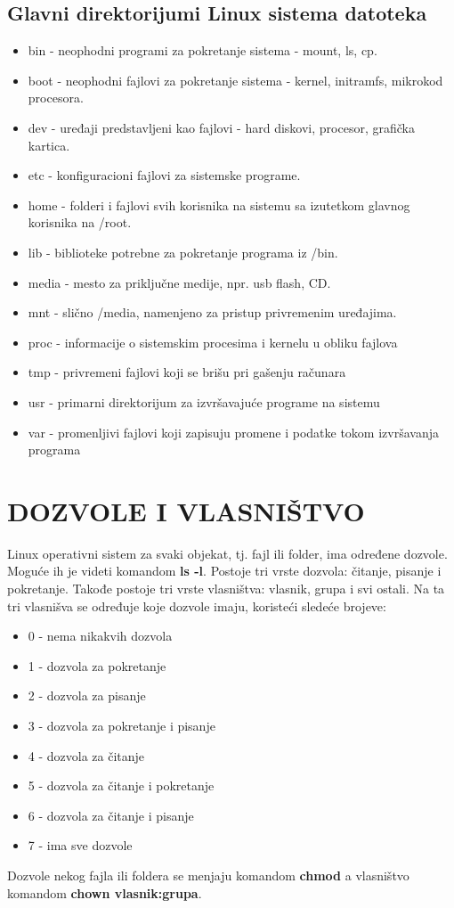 \documentclass[a4paper,14pt]{article}
\begin{document}
\subsection{Glavni direktorijumi Linux sistema datoteka}
\begin{itemize}
\item bin - neophodni programi za pokretanje sistema - mount, ls, cp.
\item boot - neophodni fajlovi za pokretanje sistema - kernel, initramfs, mikrokod procesora.
\item dev - uređaji predstavljeni kao fajlovi - hard diskovi, procesor, grafička kartica.
\item etc - konfiguracioni fajlovi za sistemske programe.
\item home - folderi i fajlovi svih korisnika na sistemu sa izutetkom glavnog korisnika na /root.
\item lib - biblioteke potrebne za pokretanje programa iz /bin.
\item media - mesto za priključne medije, npr. usb flash, CD.
\item mnt - slično /media, namenjeno za pristup privremenim uređajima.
\item proc - informacije o sistemskim procesima i kernelu u obliku fajlova
\item tmp - privremeni fajlovi koji se brišu pri gašenju računara
\item usr - primarni direktorijum za izvršavajuće programe na sistemu
\item var - promenljivi fajlovi koji zapisuju promene i podatke tokom izvršavanja programa
\end{itemize}
\newpage

\section{DOZVOLE I VLASNIŠTVO}
Linux operativni sistem za svaki objekat, tj. fajl ili folder, ima određene dozvole. Moguće ih je videti komandom \textbf{ls -l}. Postoje tri vrste dozvola: čitanje, pisanje i pokretanje. Takođe postoje tri vrste vlasništva: vlasnik, grupa i svi ostali. Na ta tri vlasnišva se određuje koje dozvole imaju, koristeći sledeće brojeve:
\begin{itemize}
\item 0 - nema nikakvih dozvola
\item 1 - dozvola za pokretanje
\item 2 - dozvola za pisanje
\item 3 - dozvola za pokretanje i pisanje
\item 4 - dozvola za čitanje
\item 5 - dozvola za čitanje i pokretanje
\item 6 - dozvola za čitanje i pisanje
\item 7 - ima sve dozvole
\end{itemize}
Dozvole nekog fajla ili foldera se menjaju komandom \textbf{chmod} a vlasništvo komandom \textbf{chown vlasnik:grupa}.
\end{document}
